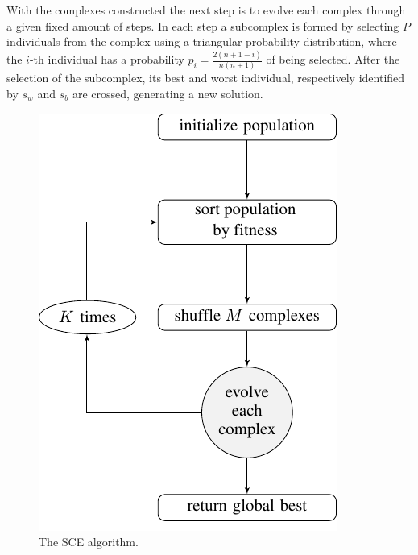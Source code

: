 \documentclass[conference, compsocconf]{IEEEtran}
\begin{document}
With the complexes constructed the next step is to evolve each complex through
a given fixed amount of steps.
In each step a subcomplex is formed by selecting $P$ individuals from the
complex using a triangular probability distribution, where the $i$-th individual
has a probability $p_i = \frac{2(n+1-i)}{n(n+1)}$ of being selected.
After the selection of the subcomplex, its best and worst individual,
respectively identified by $s_w$ and $s_b$ are crossed, generating a new
solution.

\begin{figure}
  \includegraphics{imgs/flow1}
  \caption{The SCE algorithm.}
\end{figure}
\end{document}
